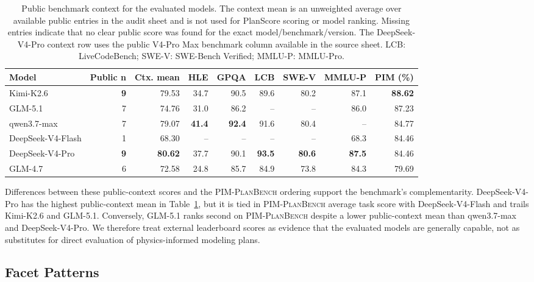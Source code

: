\documentclass[11pt]{article}
\newcommand{\pimplanbench}{\textsc{PIM-PlanBench}}
\begin{document}
\begin{table}[t]
\caption{Public benchmark context for the evaluated models. The context mean is an unweighted average over available public entries in the audit sheet and is not used for PlanScore scoring or model ranking. Missing entries indicate that no clear public score was found for the exact model/benchmark/version. The DeepSeek-V4-Pro context row uses the public V4-Pro Max benchmark column available in the source sheet. LCB: LiveCodeBench; SWE-V: SWE-Bench Verified; MMLU-P: MMLU-Pro.}
\label{tab:external-context}
\centering
\scriptsize
\begin{tabular}{lrrrrrrrr}
\toprule
\textbf{Model} & \textbf{Public n} & \textbf{Ctx. mean} & \textbf{HLE} & \textbf{GPQA} & \textbf{LCB} & \textbf{SWE-V} & \textbf{MMLU-P} & \textbf{PIM (\%)} \\
\midrule
Kimi-K2.6 & \textbf{9} & 79.53 & 34.7 & 90.5 & 89.6 & 80.2 & 87.1 & \textbf{88.62} \\
GLM-5.1 & 7 & 74.76 & 31.0 & 86.2 & -- & -- & 86.0 & 87.23 \\
qwen3.7-max & 7 & 79.07 & \textbf{41.4} & \textbf{92.4} & 91.6 & 80.4 & -- & 84.77 \\
DeepSeek-V4-Flash & 1 & 68.30 & -- & -- & -- & -- & 68.3 & 84.46 \\
DeepSeek-V4-Pro & \textbf{9} & \textbf{80.62} & 37.7 & 90.1 & \textbf{93.5} & \textbf{80.6} & \textbf{87.5} & 84.46 \\
GLM-4.7 & 6 & 72.58 & 24.8 & 85.7 & 84.9 & 73.8 & 84.3 & 79.69 \\
\bottomrule
\end{tabular}
\end{table}

Differences between these public-context scores and the \pimplanbench{} ordering support the benchmark's complementarity. DeepSeek-V4-Pro has the highest public-context mean in Table~\ref{tab:external-context}, but it is tied in \pimplanbench{} average task score with DeepSeek-V4-Flash and trails Kimi-K2.6 and GLM-5.1. Conversely, GLM-5.1 ranks second on \pimplanbench{} despite a lower public-context mean than qwen3.7-max and DeepSeek-V4-Pro. We therefore treat external leaderboard scores as evidence that the evaluated models are generally capable, not as substitutes for direct evaluation of physics-informed modeling plans.

\subsection{Facet Patterns}
\end{document}
